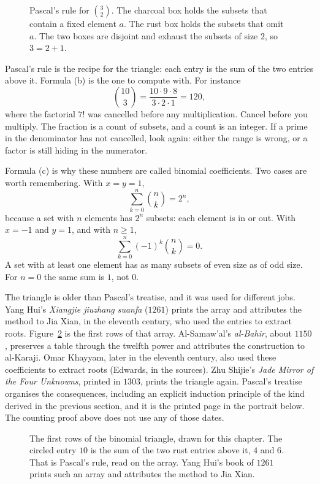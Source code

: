 \begin{figure}[ht]
\centering
{}
\caption{Pascal's rule for $\binom{3}{2}$. The charcoal box holds the subsets that contain a fixed element $a$. The rust box holds the subsets that omit $a$. The two boxes are disjoint and exhaust the subsets of size $2$, so $3=2+1$.}
\label{fig:split}
\end{figure}

Pascal's rule is the recipe for the triangle: each entry is the sum of the two entries above it. Formula (b) is the one to compute with. For instance
\[
\binom{10}{3}=\frac{10\cdot9\cdot8}{3\cdot2\cdot1}=120,
\]
where the factorial $7!$ was cancelled before any multiplication. Cancel before you multiply. The fraction is a count of subsets, and a count is an integer. If a prime in the denominator has not cancelled, look again: either the range is wrong, or a factor is still hiding in the numerator.

Formula (c) is why these numbers are called binomial coefficients. Two cases are worth remembering. With $x=y=1$,
\[
\sum_{k=0}^n\binom nk=2^n,
\]
because a set with $n$ elements has $2^n$ subsets: each element is in or out. With $x=-1$ and $y=1$, and with $n\ge1$,
\[
\sum_{k=0}^n(-1)^k\binom nk=0.
\]
A set with at least one element has as many subsets of even size as of odd size. For $n=0$ the same sum is $1$, not $0$.

The triangle is older than Pascal's treatise, and it was used for different jobs. Yang Hui's \emph{Xiangjie jiuzhang suanfa} ($1261$) prints the array and attributes the method to Jia Xian, in the eleventh century, who used the entries to extract roots. Figure~\ref{fig:rows} is the first rows of that array. Al-Samaw'al's \emph{al-Bahir}, about $1150$, preserves a table through the twelfth power and attributes the construction to al-Karaji. Omar Khayyam, later in the eleventh century, also used these coefficients to extract roots (Edwards, in the sources). Zhu Shijie's \emph{Jade Mirror of the Four Unknowns}, printed in $1303$, prints the triangle again. Pascal's treatise organises the consequences, including an explicit induction principle of the kind derived in the previous section, and it is the printed page in the portrait below. The counting proof above does not use any of those dates.

\begin{figure}[ht]
\centering
{}
\caption{The first rows of the binomial triangle, drawn for this chapter. The circled entry $10$ is the sum of the two rust entries above it, $4$ and $6$. That is Pascal's rule, read on the array. Yang Hui's book of $1261$ prints such an array and attributes the method to Jia Xian.}
\label{fig:rows}
\end{figure}

